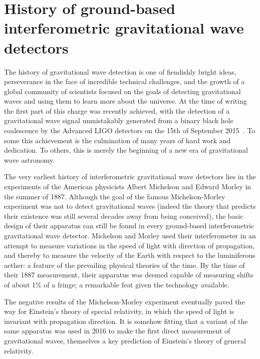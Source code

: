 \section{History of ground-based interferometric gravitational wave detectors}\label{subsec:prehistory}

The history of gravitational wave detection is one of fiendishly bright ideas, perseverance in the face of incredible 
technical challenges, and the growth of a global community of scientists focused on the goals of detecting 
gravitational waves and using them to learn more about the universe. At the time of writing the first part of this 
charge was recently achieved, with the detection of a gravitational wave signal unmistakably generated from a binary 
black hole coalescence by the Advanced LIGO detectors on the 15th of September 2015~\cite{GW150914}. To 
some this achievement is the culmination of many years of hard work and dedication. To others, this is merely 
the beginning of a new era of gravitational wave astronomy. 

The very earliest history of interferometric gravitational wave detectors lies in the experiments 
of the American physicists Albert Michelson and Edward Morley in the summer of 1887. Although 
the goal of the famous Michelson-Morley experiment was not to detect gravitational waves (indeed 
the theory that predicts their existence was still several decades away from being conceived), the basic 
design of their apparatus can still be found in every ground-based interferometric gravitational wave detector. 
Michelson and Morley used their interferometer in an attempt to measure variations in the speed of 
light with direction of propagation, and thereby to measure the velocity of the Earth with respect to the 
luminiferous aether: a feature of the prevailing physical theories of the time. By the time of their 1887 measurement, 
their apparatus was deemed capable of measuring shifts of about 1\% of a fringe; a remarkable feat given the 
technology available. 

The negative results of the Michelson-Morley experiment eventually paved the way for Einstein's theory of special 
relativity, in which the speed of light is invariant with propagation direction. It is somehow fitting that a variant 
of the same apparatus was used in 2016 to make the first direct measurement of gravitational waves, themselves 
a key prediction of Einstein's theory of general relativity. 


